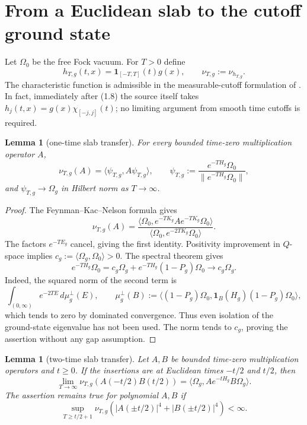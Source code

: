 \documentclass[11pt,a4paper]{article}
\newtheorem{lemma}[theorem]{Lemma}
\theoremstyle{remark}
\newcommand{\Om}{\Omega}
\begin{document}
\section{From a Euclidean slab to the cutoff ground state}

Let $\Om_0$ be the free Fock vacuum.  For $T>0$ define
\[
 h_{T,g}(t,x)=\mathbf1_{[-T,T]}(t)g(x),\qquad \nu_{T,g}:=\nu_{h_{T,g}}.
\]
The characteristic function is admissible in the measurable-cutoff formulation of
\cite[(1.8)]{GJS}.  In fact, immediately after (1.8) the source itself takes
$h_j(t,x)=g(x)\chi_{[-j,j]}(t)$; no limiting argument from smooth time cutoffs is required.

\begin{lemma}[one-time slab transfer]\label{lem:one}
For every bounded time-zero multiplication operator $A$,
\[
 \nu_{T,g}(A)=\langle\psi_{T,g},A\psi_{T,g}\rangle,
 \qquad
 \psi_{T,g}:=\frac{e^{-TH_g}\Om_0}{\|e^{-TH_g}\Om_0\|},
\]
and $\psi_{T,g}\to\Om_g$ in Hilbert norm as $T\to\infty$.
\end{lemma}

\begin{proof}
The Feynman--Kac--Nelson formula gives
\[
 \nu_{T,g}(A)=
 \frac{\langle\Om_0,e^{-TK_g}Ae^{-TK_g}\Om_0\rangle}
      {\langle\Om_0,e^{-2TK_g}\Om_0\rangle}.
\]
The factors $e^{-TE_g}$ cancel, giving the first identity.  Positivity improvement in
$Q$-space implies
$c_g:=\langle\Om_g,\Om_0\rangle>0$.  The spectral theorem gives
\[
 e^{-TH_g}\Om_0=c_g\Om_g+e^{-TH_g}(1-P_g)\Om_0
 \longrightarrow c_g\Om_g.
\]
Indeed, the squared norm of the second term is
\[
 \int_{(0,\infty)}e^{-2TE}\,d\mu_g^\perp(E),
 \qquad
 \mu_g^\perp(B):=
 \langle(1-P_g)\Om_0,\mathbf1_B(H_g)(1-P_g)\Om_0\rangle,
\]
which tends to zero by dominated convergence.  Thus even isolation of the ground-state
eigenvalue has not been used.  The norm tends to $c_g$, proving the assertion without any
gap assumption.
\end{proof}

\begin{lemma}[two-time slab transfer]\label{lem:two}
Let $A,B$ be bounded time-zero multiplication operators and $t\ge0$.  If the insertions are at
Euclidean times $-t/2$ and $t/2$, then
\[
 \lim_{T\to\infty}\nu_{T,g}(A(-t/2)B(t/2))
 =\langle\Om_g,Ae^{-tH_g}B\Om_g\rangle.
\]
The assertion remains true for polynomial $A,B$ if
\begin{equation}\label{eq:UI}
 \sup_{T\ge t/2+1}\nu_{T,g}(|A(\pm t/2)|^4+|B(\pm t/2)|^4)<\infty. \tag{3.1}
\end{equation}
\end{lemma}
\end{document}
